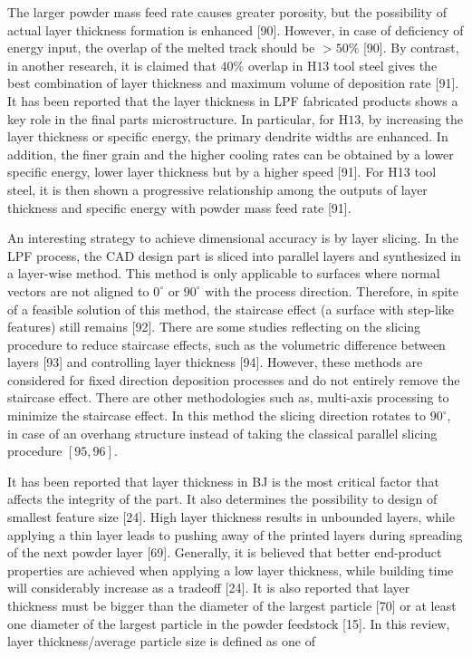 \documentclass[10pt]{article}
\begin{document}
The larger powder mass feed rate causes greater porosity, but the possibility of actual layer thickness formation is enhanced [90]. However, in case of deficiency of energy input, the overlap of the melted track should be $>50 \%$ [90]. By contrast, in another research, it is claimed that $40 \%$ overlap in $\mathrm{H} 13$ tool steel gives the best combination of layer thickness and maximum volume of deposition rate [91]. It has been reported that the layer thickness in LPF fabricated products shows a key role in the final parts microstructure. In particular, for $\mathrm{H} 13$, by increasing the layer thickness or specific energy, the primary dendrite widths are enhanced. In addition, the finer grain and the higher cooling rates can be obtained by a lower specific energy, lower layer thickness but by a higher speed [91]. For H13 tool steel, it is then shown a progressive relationship among the outputs of layer thickness and specific energy with powder mass feed rate [91].

An interesting strategy to achieve dimensional accuracy is by layer slicing. In the LPF process, the CAD design part is sliced into parallel layers and synthesized in a layer-wise method. This method is only applicable to surfaces where normal vectors are not aligned to $0^{\circ}$ or $90^{\circ}$ with the process direction. Therefore, in spite of a feasible solution of this method, the staircase effect (a surface with step-like features) still remains [92]. There are some studies reflecting on the slicing procedure to reduce staircase effects, such as the volumetric difference between layers [93] and controlling layer thickness [94]. However, these methods are considered for fixed direction deposition processes and do not entirely remove the staircase effect. There are other methodologies such as, multi-axis processing to minimize the staircase effect. In this method the slicing direction rotates to $90^{\circ}$, in case of an overhang structure instead of taking the classical parallel slicing procedure $[95,96]$.

It has been reported that layer thickness in BJ is the most critical factor that affects the integrity of the part. It also determines the possibility to design of smallest feature size [24]. High layer thickness results in unbounded layers, while applying a thin layer leads to pushing away of the printed layers during spreading of the next powder layer [69]. Generally, it is believed that better end-product properties are achieved when applying a low layer thickness, while building time will considerably increase as a tradeoff [24]. It is also reported that layer thickness must be bigger than the diameter of the largest particle [70] or at least one diameter of the largest particle in the powder feedstock [15]. In this review, layer thickness/average particle size is defined as one of
\end{document}
